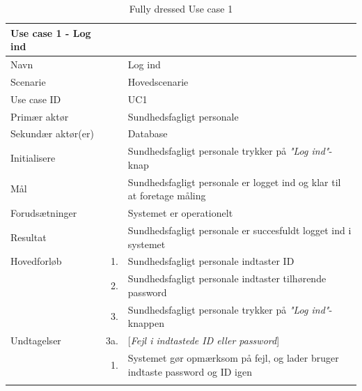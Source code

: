 \begin{longtabu} to 
\toprule
    {\large \textbf{Use case 1 - Log ind}} && \\
    \toprule
    Navn &&    Log ind\\
    Scenarie &&    Hovedscenarie\\
    Use case ID &&    UC1\\
    Primær aktør &&    Sundhedsfagligt personale\\
    Sekundær aktør(er) &&    Database\\
    Initialisere &&    Sundhedsfagligt personale trykker på \textit{"Log ind"}-knap\\
    Mål &&    Sundhedsfagligt personale er logget ind og klar til at foretage måling\\
    Forudsætninger &&    Systemet er operationelt\\
    Resultat &&    Sundhedsfagligt personale er succesfuldt logget ind i systemet\\
    \toprule
    
    Hovedforløb &    1. &    Sundhedsfagligt personale indtaster ID\\[-1ex]
                &    2. &    Sundhedsfagligt personale indtaster tilhørende password\\[-1ex]
                &    3. &    Sundhedsfagligt personale trykker på \textit{"Log ind"}-knappen\\[-1ex]
                            
    \toprule
    Undtagelser &    3a. & [\textit{Fejl i indtastede ID eller password}] \\[-1ex]
    & 1. &  Systemet gør opmærksom på fejl, og lader bruger indtaste password og ID igen\\[-1ex]
                \toprule
   
\caption{Fully dressed Use case 1}
\label{UC1}
\end{longtabu}
\newpage


